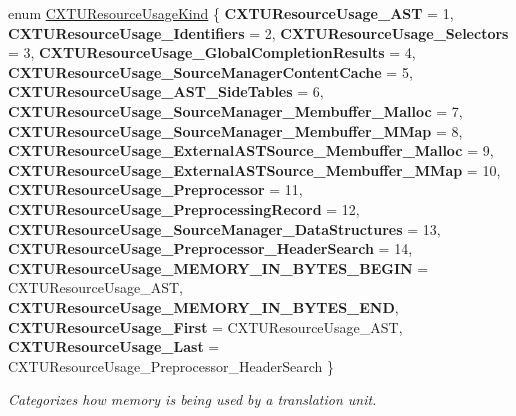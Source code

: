 \begin{DoxyCompactItemize}
\mbox{\label{group__CINDEX__TRANSLATION__UNIT_ga13810240df7c205de04daac58f956396}} 
enum \mbox{\hyperlink{group__CINDEX__TRANSLATION__UNIT_ga13810240df7c205de04daac58f956396}{C\+X\+T\+U\+Resource\+Usage\+Kind}} \{ \newline
{\bfseries C\+X\+T\+U\+Resource\+Usage\+\_\+\+A\+ST} = 1, 
{\bfseries C\+X\+T\+U\+Resource\+Usage\+\_\+\+Identifiers} = 2, 
{\bfseries C\+X\+T\+U\+Resource\+Usage\+\_\+\+Selectors} = 3, 
{\bfseries C\+X\+T\+U\+Resource\+Usage\+\_\+\+Global\+Completion\+Results} = 4, 
\newline
{\bfseries C\+X\+T\+U\+Resource\+Usage\+\_\+\+Source\+Manager\+Content\+Cache} = 5, 
{\bfseries C\+X\+T\+U\+Resource\+Usage\+\_\+\+A\+S\+T\+\_\+\+Side\+Tables} = 6, 
{\bfseries C\+X\+T\+U\+Resource\+Usage\+\_\+\+Source\+Manager\+\_\+\+Membuffer\+\_\+\+Malloc} = 7, 
{\bfseries C\+X\+T\+U\+Resource\+Usage\+\_\+\+Source\+Manager\+\_\+\+Membuffer\+\_\+\+M\+Map} = 8, 
\newline
{\bfseries C\+X\+T\+U\+Resource\+Usage\+\_\+\+External\+A\+S\+T\+Source\+\_\+\+Membuffer\+\_\+\+Malloc} = 9, 
{\bfseries C\+X\+T\+U\+Resource\+Usage\+\_\+\+External\+A\+S\+T\+Source\+\_\+\+Membuffer\+\_\+\+M\+Map} = 10, 
{\bfseries C\+X\+T\+U\+Resource\+Usage\+\_\+\+Preprocessor} = 11, 
{\bfseries C\+X\+T\+U\+Resource\+Usage\+\_\+\+Preprocessing\+Record} = 12, 
\newline
{\bfseries C\+X\+T\+U\+Resource\+Usage\+\_\+\+Source\+Manager\+\_\+\+Data\+Structures} = 13, 
{\bfseries C\+X\+T\+U\+Resource\+Usage\+\_\+\+Preprocessor\+\_\+\+Header\+Search} = 14, 
{\bfseries C\+X\+T\+U\+Resource\+Usage\+\_\+\+M\+E\+M\+O\+R\+Y\+\_\+\+I\+N\+\_\+\+B\+Y\+T\+E\+S\+\_\+\+B\+E\+G\+IN} = C\+X\+T\+U\+Resource\+Usage\+\_\+\+A\+ST, 
{\bfseries C\+X\+T\+U\+Resource\+Usage\+\_\+\+M\+E\+M\+O\+R\+Y\+\_\+\+I\+N\+\_\+\+B\+Y\+T\+E\+S\+\_\+\+E\+ND}, 
\newline
{\bfseries C\+X\+T\+U\+Resource\+Usage\+\_\+\+First} = C\+X\+T\+U\+Resource\+Usage\+\_\+\+A\+ST, 
{\bfseries C\+X\+T\+U\+Resource\+Usage\+\_\+\+Last} = C\+X\+T\+U\+Resource\+Usage\+\_\+\+Preprocessor\+\_\+\+Header\+Search
 \}
\begin{DoxyCompactList}\small\item\em Categorizes how memory is being used by a translation unit. \end{DoxyCompactList}\end{DoxyCompactItemize}
